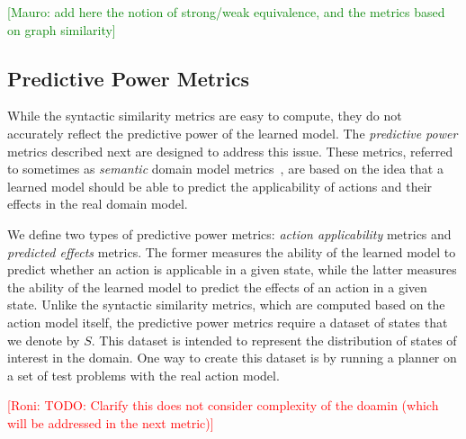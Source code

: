 \documentclass{article}
\theoremstyle{definition}
\theoremstyle{remark}
\newcommand{\roni}[1]{{\textcolor{red}{[Roni: #1]}}}
\newcommand{\mauro}[1]{{\textcolor{green}{[Mauro: #1]}}}
\begin{document}
\mauro{add here the notion of strong/weak equivalence, and the metrics based on graph similarity}


\subsection{Predictive Power Metrics}
\label{sec:predictiveness-metrics}
While the syntactic similarity metrics are easy to compute, they do not accurately reflect the predictive power of the learned model. 
The \emph{predictive power} metrics described next are designed to address this issue. 
These metrics, referred to sometimes as \emph{semantic} domain model metrics~\citep{aineto2019learning,mordoch2024safe,le2024learning}, are based on the idea that a learned model should be able to predict the applicability of actions and their effects in the real domain model. 


We define two types of predictive power metrics: \emph{action applicability} metrics and \emph{predicted effects} metrics. 
The former measures the ability of the learned model to predict whether an action is applicable in a given state, while the latter measures the ability of the learned model to predict the effects of an action in a given state.
Unlike the syntactic similarity metrics, which are computed based on the action model itself, the predictive power metrics require a dataset of states that we denote by $S$. 
This dataset is intended to represent the distribution of states of interest in the domain. 
One way to create this dataset is by running a planner on a set of test problems with the real action model. 

\roni{TODO: Clarify this does not consider complexity of the doamin (which will be addressed in the next metric)}
\end{document}
